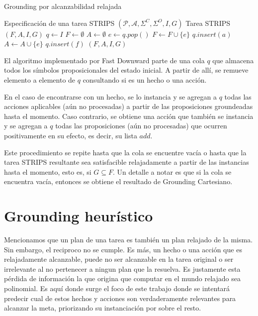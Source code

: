 \begin{algorithm}
    \caption{Grounding por alcanzabilidad relajada}\label{alg:cap}
    \begin{algorithmic}
    \Require Especificación de una tarea STRIPS $(\mathcal{P}, \mathcal{A},
    \Sigma^{C}, \Sigma^{O}, I, G)$
    \Ensure Tarea STRIPS $(F, A, I, G)$ 
    \State $q \gets I$
    \State $F \gets \emptyset$
    \State $A \gets \emptyset$
    \State $e \gets q.pop()$
        \State $F \gets F \cup \{e\}$
            \State $q.insert(a)$
        \EndFor
    \Else
        \State $A \gets A \cup \{e\}$
            \State $q.insert(f)$
        \EndFor
    \EndIf
    \EndWhile
    \State \Return $(F, A, I, G)$
    \end{algorithmic}
\end{algorithm}

El algoritmo implementado por Fast Downward parte de una cola $q$ que almacena
todos los símbolos proposicionales del estado inicial. A partir de allí, se
remueve elemento a elemento de $q$ consultando si es un hecho o una acción.

En el caso de encontrarse con un hecho, se lo instancia y se agregan a $q$ todas
las acciones aplicables (aún no procesadas) a partir de las proposiciones
groundeadas hasta el momento. Caso contrario, se obtiene una acción que también
se instancia y se agregan a $q$ todas las proposiciones (aún no procesadas) que
ocurren positivamente en su efecto, es decir, su lista $add$.

Este procedimiento se repite hasta que la cola se encuentre vacía o hasta que la
tarea STRIPS resultante sea satisfacible relajadamente a partir de las
instancias hasta el momento, esto es, si $G \subseteq F$. Un detalle a notar
es que si la cola se encuentra vacía, entonces se obtiene el resultado de
Grounding Cartesiano.

\section{Grounding heurístico}

Mencionamos que un plan de una tarea es también un plan relajado de la misma.
Sin embargo, el reciproco no se cumple. Es más, un hecho o una acción que es
relajadamente alcanzable, puede no ser alcanzable en la tarea original o ser
irrelevante al no pertenecer a ningun plan que la resuelva. Es justamente esta
pérdida de información la que origina que computar en el mundo relajado sea
polinomial. Es aquí donde surge el foco de este trabajo donde se intentará
predecir cual de estos hechos y acciones son verdaderamente relevantes para
alcanzar la meta, priorizando su instanciación por sobre el resto.

